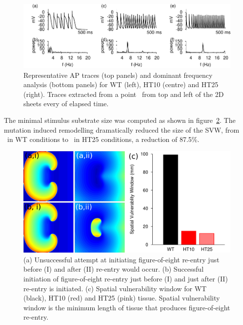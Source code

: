 \begin{figure}
\includegraphics{figures/atrium/iks/figures/05_2D_freq}
\caption[Frequency of extracted APs from 2D sheets with S140G mutation]{
\label{atrium:iks:twodfreq}
Representative AP traces (top panels) and dominant frequency analysis (bottom
panels) for WT (left), HT10 (centre) and HT25 (right).  Traces extracted from a
point \ from top and left of the 2D sheets every  of elapsed time.
}
\end{figure}

The minimal stimulus substrate size was computed as shown in
figure~\ref{atrium:iks:svw}.
The mutation induced remodelling dramatically reduced the size of the SVW, from
\ in WT conditions to \ in HT25 conditions, a reduction of
87.5\%.

\begin{figure}
\includegraphics{figures/atrium/iks/07_svw}
\caption[Spatial Vulnerability Window with S140G mutation]{
\label{atrium:iks:svw}
(a) Unsuccessful attempt at initiating figure-of-eight re-entry just
before (I) and after (II) re-entry would occur.
(b) Successful initiation of figure-of-eight re-entry just before (I) and
just after (II) re-entry is initiated.
(c) Spatial vulnerability window for WT (black), HT10 (red) and HT25
(pink) tissue.
Spatial vulnerability window is the minimum length of tissue that produces
figure-of-eight re-entry.
}
\end{figure}


